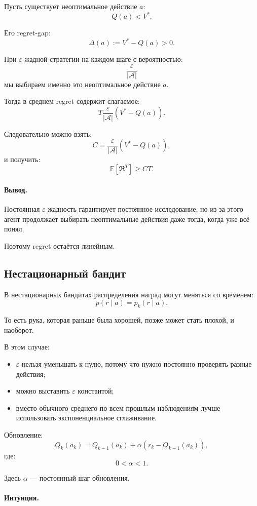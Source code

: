\documentclass[12pt,a4paper]{article}
\begin{document}
Пусть существует неоптимальное действие $a$:
\[
Q(a)<V^\ast.
\]

Его regret-gap:
\[
\Delta(a)
:=
V^\ast-Q(a)
>
0.
\]

При $\varepsilon$-жадной стратегии на каждом шаге с вероятностью:
\[
\frac{\varepsilon}{|\mathcal A|}
\]
мы выбираем именно это неоптимальное действие $a$.

Тогда в среднем regret содержит слагаемое:
\[
T\frac{\varepsilon}{|\mathcal A|}
\left(
V^\ast-Q(a)
\right).
\]

Следовательно можно взять:
\[
C
=
\frac{\varepsilon}{|\mathcal A|}
\left(
V^\ast-Q(a)
\right),
\]
и получить:
\[
\mathbb E
\left[
\mathfrak R^T
\right]
\ge
CT.
\]

\paragraph{Вывод.}

Постоянная $\varepsilon$-жадность гарантирует постоянное исследование, но из-за этого агент продолжает выбирать неоптимальные действия даже тогда, когда уже всё понял.

Поэтому regret остаётся линейным.

\subsection{Нестационарный бандит}

В нестационарных бандитах распределения наград могут меняться со временем:
\[
p(r\mid a)
=
p_k(r\mid a).
\]

То есть рука, которая раньше была хорошей, позже может стать плохой, и наоборот.

В этом случае:

\begin{itemize}
    \item $\varepsilon$ нельзя уменьшать к нулю, потому что нужно постоянно проверять разные действия;
    \item можно выставить $\varepsilon$ константой;
    \item вместо обычного среднего по всем прошлым наблюдениям лучше использовать экспоненциальное сглаживание.
\end{itemize}

Обновление:
\[
Q_k(a_k)
=
Q_{k-1}(a_k)
+
\alpha
\left(
r_k-Q_{k-1}(a_k)
\right),
\]
где:
\[
0<\alpha<1.
\]

Здесь $\alpha$ --- постоянный шаг обновления.

\paragraph{Интуиция.}
\end{document}
